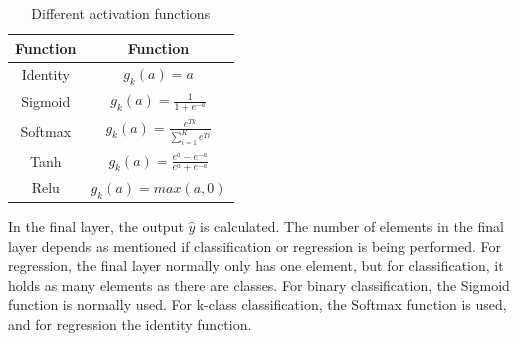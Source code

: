     \begin{table}[h]
        \centering
        \begin{tabular}{ | c | c |}
            \hline
            Function & Function\\ \hline
            Identity & $g_k(a) =a$ \\ \hline
            Sigmoid & $g_k(a) =\frac{1}{1+e^{-a}}$ \\ \hline
            Softmax & $g_k(a) =\frac{e^{Tk}}{\sum_{i=1}^Ke^{Ti}}$ \\ \hline
            Tanh & $g_k(a) =\frac{e^a-e^{-a}}{e^a+e^{-a}}$ \\ \hline
            Relu & $g_k(a) =max(a,0)$ \\ \hline
        \end{tabular}
        \caption{Different activation functions}
        \label{tab:acitvations}
    \end{table}
                
        
        In the final layer, the output $\hat y$ is calculated. The number of elements in the final layer depends as mentioned if classification or regression is being performed. For regression, the final layer normally only has one element, but for classification, it holds as many elements as there are classes. For binary classification, the Sigmoid function is normally used. For k-class classification, the Softmax function is used, and for regression the identity function.
        
